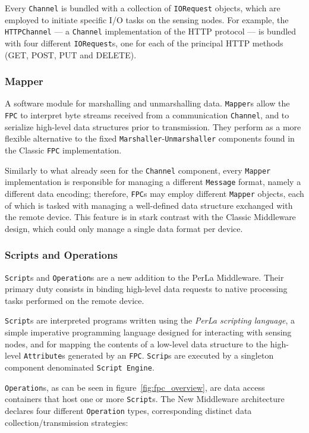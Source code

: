 Every \texttt{Channel} is bundled with a collection of \texttt{IORequest}
objects, which are employed to initiate specific I/O tasks on the sensing
nodes. For example, the \texttt{HTTPChannel} --- a \texttt{Channel}
implementation of the HTTP protocol --- is bundled with four different
\texttt{IORequest}s, one for each of the principal HTTP methods (GET, POST, PUT
and DELETE).

\subsubsection{Mapper}

A software module for marshalling and unmarshalling data. \texttt{Mapper}s
allow the \texttt{FPC} to interpret byte streams received from a communication
\texttt{Channel}, and to serialize high-level data structures prior to
transmission. They perform as a more flexible alternative to the fixed
\texttt{Marshaller}-\texttt{Unmarshaller} components found in the Classic
\texttt{FPC} implementation.

Similarly to what already seen for the \texttt{Channel} component, every
\texttt{Mapper} implementation is responsible for managing a different
\texttt{Message} format, namely a different data encoding; therefore,
\texttt{FPC}s may employ different \texttt{Mapper} objects, each of which is
tasked with managing a well-defined data structure exchanged with the remote
device. This feature is in stark contrast with the Classic Middleware design,
which could only manage a single data format per device.

\subsubsection{Scripts and Operations}

\texttt{Script}s and \texttt{Operation}s are a new addition to the PerLa
Middleware. Their primary duty consists in binding high-level data requests to
native processing tasks performed on the remote device.

\texttt{Script}s are interpreted programs written using the \textit{PerLa
scripting language}, a simple imperative programming language designed for
interacting with sensing nodes, and for mapping the contents of a low-level
data structure to the high-level \texttt{Attribute}s generated by an
\texttt{FPC}. \texttt{Scrip}s are executed by a singleton component denominated
\texttt{Script Engine}.

\texttt{Operation}s, as can be seen in figure~\ref{fig:fpc_overview}, are data
access containers that host one or more \texttt{Script}s. The New Middleware
architecture declares four different \texttt{Operation} types, corresponding 
distinct data collection/transmission strategies:

